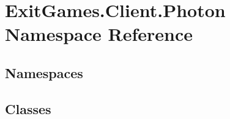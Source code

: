 \hypertarget{namespace_exit_games_1_1_client_1_1_photon}{}\section{Exit\+Games.\+Client.\+Photon Namespace Reference}
\label{namespace_exit_games_1_1_client_1_1_photon}
\subsection*{Namespaces}
\begin{DoxyCompactItemize}
\end{DoxyCompactItemize}
\subsection*{Classes}

